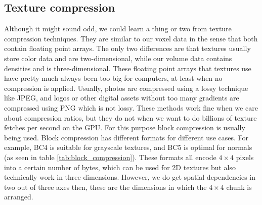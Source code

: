 \subsection{Texture compression} \label{related_work:texture_compression}
Although it might sound odd, we could learn a thing or two from texture compression techniques. They are similar to our voxel data in the sense that both contain floating point arrays. The only two differences are that textures usually store color data and are two-dimensional, while our volume data contains densities and is three-dimensional. These floating point arrays that textures use have pretty much always been too big for computers, at least when no compression is applied. Usually, photos are compressed using a lossy technique like JPEG, and logos or other digital assets without too many gradients are compressed using PNG which is not lossy. These methods work fine when we care about compression ratios, but they do not when we want to do billions of texture fetches per second on the GPU. For this purpose block compression is usually being used\cite{BlockCompression}. Block compression has different formats for different use cases. For example, BC4 is suitable for grayscale textures, and BC5 is optimal for normals (as seen in table \ref{tab:block_compression}). These formats all encode $4\times 4$ pixels into a certain number of bytes, which can be used for 2D textures but also technically work in three dimensions. However, we do get spatial dependencies in two out of three axes then, these are the dimensions in which the $4\times 4$ chunk is arranged.

